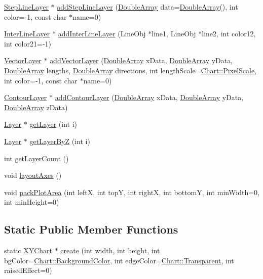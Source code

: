 \begin{DoxyCompactItemize}
\item 
\hyperlink{class_step_line_layer}{Step\+Line\+Layer} $\ast$ \hyperlink{class_x_y_chart_a6e09d8cb36b0c8299c44836f687595b1}{add\+Step\+Line\+Layer} (\hyperlink{class_double_array}{Double\+Array} data=\hyperlink{class_double_array}{Double\+Array}(), int color=-\/1, const char $\ast$name=0)
\item 
\hyperlink{class_inter_line_layer}{Inter\+Line\+Layer} $\ast$ \hyperlink{class_x_y_chart_ae674c8d52d32574672d845c5f154f9d3}{add\+Inter\+Line\+Layer} (Line\+Obj $\ast$line1, Line\+Obj $\ast$line2, int color12, int color21=-\/1)
\item 
\hyperlink{class_vector_layer}{Vector\+Layer} $\ast$ \hyperlink{class_x_y_chart_aa353997d175e029e1e1269729a7d987a}{add\+Vector\+Layer} (\hyperlink{class_double_array}{Double\+Array} x\+Data, \hyperlink{class_double_array}{Double\+Array} y\+Data, \hyperlink{class_double_array}{Double\+Array} lengths, \hyperlink{class_double_array}{Double\+Array} directions, int length\+Scale=\hyperlink{namespace_chart_af8005281e1fb57d737e9f89b13605808afebebf69a28e58958dc5f9da3ece2147}{Chart\+::\+Pixel\+Scale}, int color=-\/1, const char $\ast$name=0)
\item 
\hyperlink{class_contour_layer}{Contour\+Layer} $\ast$ \hyperlink{class_x_y_chart_a43cb04a6549ac473640df206e3a8b20f}{add\+Contour\+Layer} (\hyperlink{class_double_array}{Double\+Array} x\+Data, \hyperlink{class_double_array}{Double\+Array} y\+Data, \hyperlink{class_double_array}{Double\+Array} z\+Data)
\item 
\hyperlink{class_layer}{Layer} $\ast$ \hyperlink{class_x_y_chart_a2a4212951b62b1e2e1b64f1c7545187e}{get\+Layer} (int i)
\item 
\hyperlink{class_layer}{Layer} $\ast$ \hyperlink{class_x_y_chart_a4de65c0474c84c4986a3d1f48cf98abe}{get\+Layer\+ByZ} (int i)
\item 
int \hyperlink{class_x_y_chart_a46dc94fc5ac9a9d037e11c5d23e7b89a}{get\+Layer\+Count} ()
\item 
void \hyperlink{class_x_y_chart_a06c7c3e15a931c6e9611596a67dd87f6}{layout\+Axes} ()
\item 
void \hyperlink{class_x_y_chart_a2d607d6dc0522d1f8547c72e007c538d}{pack\+Plot\+Area} (int leftX, int topY, int rightX, int bottomY, int min\+Width=0, int min\+Height=0)
\end{DoxyCompactItemize}
\subsection*{Static Public Member Functions}
\begin{DoxyCompactItemize}
\item 
static \hyperlink{class_x_y_chart}{X\+Y\+Chart} $\ast$ \hyperlink{class_x_y_chart_a04ee62276a0fbe1575caf96147b4e773}{create} (int width, int height, int bg\+Color=\hyperlink{namespace_chart_abee0d882fdc9ad0b001245ad9fc64011a134193bde693b9d152d0c6dc59fa7d7f}{Chart\+::\+Background\+Color}, int edge\+Color=\hyperlink{namespace_chart_abee0d882fdc9ad0b001245ad9fc64011afc6811800a9e2582dac0157b6279f836}{Chart\+::\+Transparent}, int raised\+Effect=0)
\end{DoxyCompactItemize}
